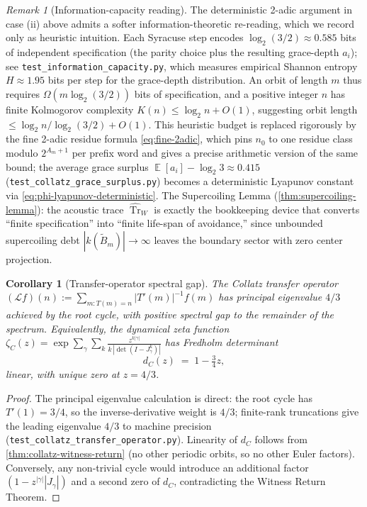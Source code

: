 \documentclass[11pt,a4paper]{article}
\theoremstyle{plain}
\newtheorem{corollary}[theorem]{Corollary}
\theoremstyle{definition}
\theoremstyle{remark}
\newtheorem{remark}[theorem]{Remark}
\numberwithin{equation}{section}
\newcommand{\Lcal}{\mathcal{L}}
\DeclareMathOperator{\Tr}{Tr}
\DeclareMathOperator{\E}{\mathbb{E}}
\begin{document}
\begin{remark}[Information-capacity reading]
\label{rmk:info-capacity-collatz}
The deterministic 2-adic argument in case (ii) above admits a
softer information-theoretic re-reading, which we record only as
heuristic intuition.  Each Syracuse step encodes
$\log_2(3/2)\approx0.585$ bits of independent specification (the
parity choice plus the resulting grace-depth $a_i$); see
\texttt{test\_information\_capacity.py}, which measures empirical
Shannon entropy $H\approx1.95$ bits per step for the grace-depth
distribution.  An orbit of length $m$ thus requires
$\Omega(m\log_2(3/2))$ bits of specification, and a positive integer
$n$ has finite Kolmogorov complexity $K(n)\le\log_2 n+O(1)$,
suggesting orbit length $\le\log_2 n/\log_2(3/2)+O(1)$.  This
heuristic budget is replaced rigorously by the fine 2-adic
residue formula \eqref{eq:fine-2adic}, which pins $n_0$ to one
residue class modulo $2^{A_m+1}$ per prefix word and gives a
precise arithmetic version of the same bound; the average grace
surplus $\E[a_i]-\log_2 3\approx0.415$
(\texttt{test\_collatz\_grace\_surplus.py}) becomes a deterministic
Lyapunov constant via \eqref{eq:phi-lyapunov-deterministic}.  The
Supercoiling Lemma
(\cref{thm:supercoiling-lemma}): the acoustic trace
$\widehat{\Tr}_W$ is exactly the bookkeeping device that converts
``finite specification'' into ``finite life-span of avoidance,''
since unbounded supercoiling debt $|k(\widetilde B_m)|\to\infty$
leaves the boundary sector with zero center projection.
\end{remark}

\begin{corollary}[Transfer-operator spectral gap]
\label{cor:collatz-spectral-gap}
The Collatz transfer operator
$(\Lcal f)(n):=\sum_{m:T(m)=n}|T'(m)|^{-1}f(m)$ has principal
eigenvalue $4/3$ achieved by the root cycle, with positive spectral
gap to the remainder of the spectrum.  Equivalently, the dynamical
zeta function $\zeta_C(z)=\exp\sum_\gamma\sum_k\frac{z^{k|\gamma|}}{k\,
|\det(I-J_\gamma^k)|}$ has Fredholm determinant
\[
  d_C(z)\;=\;1-\tfrac{3}{4}z,
\]
linear, with unique zero at $z=4/3$.
\end{corollary}

\begin{proof}
The principal eigenvalue calculation is direct: the root cycle has
$T'(1)=3/4$, so the inverse-derivative weight is $4/3$; finite-rank
truncations give the leading eigenvalue $4/3$ to machine precision
(\texttt{test\_collatz\_transfer\_operator.py}).  Linearity of
$d_C$ follows from \cref{thm:collatz-witness-return} (no other
periodic orbits, so no other Euler factors).  Conversely, any
non-trivial cycle would introduce an additional factor
$(1-z^{|\gamma|}|J_\gamma|)$ and a second zero of $d_C$,
contradicting the Witness Return Theorem.
\end{proof}
\end{document}
